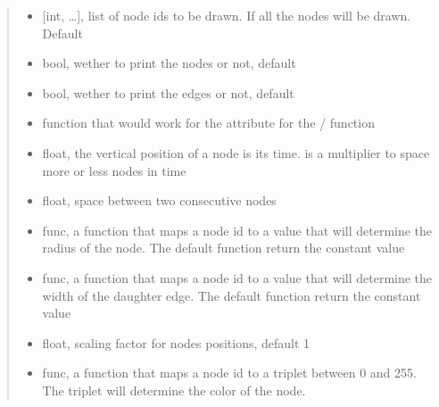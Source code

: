 \documentclass[letterpaper,10pt,english]{sphinxmanual}
\begin{document}
\begin{fulllineitems}
\begin{fulllineitems}
\begin{quote}
\begin{description}
\begin{itemize}
\item {} 
 \textendash{} {[}int, …{]}, list of node ids to be drawn. If  all the nodes will be drawn. Default 

\item {} 
 \textendash{} bool, wether to print the nodes or not, default 

\item {} 
 \textendash{} bool, wether to print the edges or not, default 

\item {} 
 \textendash{} function that would work for the attribute  for the / function

\item {} 
 \textendash{} float, the vertical position of a node is its time.  is a
multiplier to space more or less nodes in time

\item {} 
 \textendash{} float, space between two consecutive nodes

\item {} 
 \textendash{} func, a function that maps a node id to a  value that will determine the
radius of the node. The default function return the constant value 

\item {} 
 \textendash{} func, a function that maps a node id to a  value that will determine the
width of the daughter edge.  The default function return the constant value 

\item {} 
 \textendash{} float, scaling factor for nodes positions, default 1

\item {} 
 \textendash{} func, a function that maps a node id to a triplet between 0 and 255.
The triplet will determine the color of the node.


\end{itemize}
\end{description}
\end{quote}
\end{fulllineitems}
\end{fulllineitems}
\end{document}
